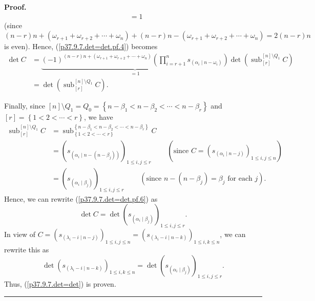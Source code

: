 \documentclass[numbers=enddot,12pt,final,onecolumn,notitlepage]{scrartcl}%
\theoremstyle{definition}
\newenvironment{proof}[1][Proof]{\noindent\textbf{#1.} }{\ \rule{0.5em}{0.5em}}
\let\prodnonlimits\prod
\renewcommand{\prod}{\prodnonlimits\limits}
\begin{document}
\begin{enumerate}
\begin{proof}
\begin{align*}
&  =1
\end{align*}
(since $\left(  n-r\right)  n+\left(  \omega_{r+1}+\omega_{r+2}+\cdots
+\omega_{n}\right)  +\left(  n-r\right)  n-\left(  \omega_{r+1}+\omega
_{r+2}+\cdots+\omega_{n}\right)  =2\left(  n-r\right)  n$ is even). Hence,
(\ref{p37.9.7.det=det.pf.4}) becomes%
\begin{align}
\det C  &  =\underbrace{\left(  -1\right)  ^{\left(  n-r\right)  n+\left(
\omega_{r+1}+\omega_{r+2}+\cdots+\omega_{n}\right)  }\left(  \prod_{i=r+1}%
^{n}s_{\left(  \alpha_{i}\mid n-\omega_{i}\right)  }\right)  }_{=1}\det\left(
\operatorname*{sub}\nolimits_{\left[  r\right]  }^{\left[  n\right]  \setminus
Q_{1}}C\right) \nonumber\\
&  =\det\left(  \operatorname*{sub}\nolimits_{\left[  r\right]  }^{\left[
n\right]  \setminus Q_{1}}C\right)  . \label{p37.9.7.det=det.pf.6}%
\end{align}


Finally, since $\left[  n\right]  \setminus Q_{1}=Q_{0}=\left\{  n-\beta
_{1}<n-\beta_{2}<\cdots<n-\beta_{r}\right\}  $ and $\left[  r\right]
=\left\{  1<2<\cdots<r\right\}  $, we have%
\begin{align*}
\operatorname*{sub}\nolimits_{\left[  r\right]  }^{\left[  n\right]  \setminus
Q_{1}}C  &  =\operatorname*{sub}\nolimits_{\left\{  1<2<\cdots<r\right\}
}^{\left\{  n-\beta_{1}<n-\beta_{2}<\cdots<n-\beta_{r}\right\}  }C\\
&  =\left(  s_{\left(  \alpha_{i}\mid n-\left(  n-\beta_{j}\right)  \right)
}\right)  _{1\leq i,j\leq r}\ \ \ \ \ \ \ \ \ \ \left(  \text{since }C=\left(
s_{\left(  \alpha_{i}\mid n-j\right)  }\right)  _{1\leq i,j\leq n}\right) \\
&  =\left(  s_{\left(  \alpha_{i}\mid\beta_{j}\right)  }\right)  _{1\leq
i,j\leq r}\ \ \ \ \ \ \ \ \ \ \left(  \text{since }n-\left(  n-\beta
_{j}\right)  =\beta_{j}\text{ for each }j\right)  .
\end{align*}
Hence, we can rewrite (\ref{p37.9.7.det=det.pf.6}) as%
\[
\det C=\det\left(  s_{\left(  \alpha_{i}\mid\beta_{j}\right)  }\right)
_{1\leq i,j\leq r}.
\]
In view of $C=\left(  s_{\left(  \lambda_{i}-i\mid n-j\right)  }\right)
_{1\leq i,j\leq n}=\left(  s_{\left(  \lambda_{i}-i\mid n-k\right)  }\right)
_{1\leq i,k\leq n}$, we can rewrite this as%
\[
\det\left(  s_{\left(  \lambda_{i}-i\mid n-k\right)  }\right)  _{1\leq i,k\leq
n}=\det\left(  s_{\left(  \alpha_{i}\mid\beta_{j}\right)  }\right)  _{1\leq
i,j\leq r}.
\]
Thus, (\ref{p37.9.7.det=det}) is proven.
\end{proof}


\end{enumerate}
\end{document}
